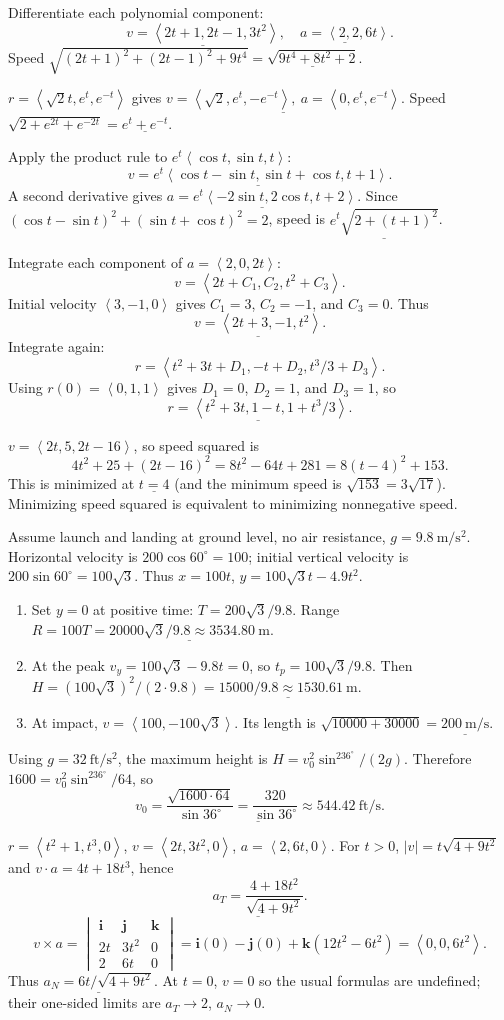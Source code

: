 \documentclass[10pt]{article}
\newcommand{\ex}[1]{\par\addvspace{6pt}\noindent\llap{\makebox[.62in][r]{\large\bfseries #1.\hspace{.12in}}}\ignorespaces}
\newcommand{\ans}[1]{\underline{#1}}
\newcommand{\vv}[1]{\left\langle #1\right\rangle}
\newcommand{\ii}{\mathbf i}\newcommand{\jj}{\mathbf j}\newcommand{\kk}{\mathbf k}
\newcommand{\cp}[6]{\begin{vmatrix}\ii&\jj&\kk\\#1&#2&#3\\#4&#5&#6\end{vmatrix}}
\begin{document}
\ex{9}
Differentiate each polynomial component:
\[\ans{v=\vv{2t+1,2t-1,3t^2}},\quad\ans{a=\vv{2,2,6t}}.\]
Speed $\sqrt{(2t+1)^2+(2t-1)^2+9t^4}=\ans{\sqrt{9t^4+8t^2+2}}$.
\ex{11}
$r=\vv{\sqrt2t,e^t,e^{-t}}$ gives $\ans{v=\vv{\sqrt2,e^t,-e^{-t}},\ a=\vv{0,e^t,e^{-t}}}$. Speed $\sqrt{2+e^{2t}+e^{-2t}}=\ans{e^t+e^{-t}}$.
\ex{13}
Apply the product rule to $e^t\vv{\cos t,\sin t,t}$:
\[\ans{v=e^t\vv{\cos t-\sin t,\sin t+\cos t,t+1}}.\]
A second derivative gives $\ans{a=e^t\vv{-2\sin t,2\cos t,t+2}}$. Since $(\cos t-\sin t)^2+(\sin t+\cos t)^2=2$, speed is $\ans{e^t\sqrt{2+(t+1)^2}}$.
\ex{15}
Integrate each component of $a=\vv{2,0,2t}$:
\[v=\vv{2t+C_1,C_2,t^2+C_3}.\]
Initial velocity $\vv{3,-1,0}$ gives $C_1=3$, $C_2=-1$, and $C_3=0$. Thus
\[\ans{v=\vv{2t+3,-1,t^2}}.\]
Integrate again:
\[r=\vv{t^2+3t+D_1,-t+D_2,t^3/3+D_3}.\]
Using $r(0)=\vv{0,1,1}$ gives $D_1=0$, $D_2=1$, and $D_3=1$, so
\[\ans{r=\vv{t^2+3t,1-t,1+t^3/3}}.\]
\ex{19}
$v=\vv{2t,5,2t-16}$, so speed squared is
\[4t^2+25+(2t-16)^2=8t^2-64t+281=8(t-4)^2+153.\]
This is minimized at $\ans{t=4}$ (and the minimum speed is $\sqrt{153}=3\sqrt{17}$). Minimizing speed squared is equivalent to minimizing nonnegative speed.
\ex{23}
Assume launch and landing at ground level, no air resistance, $g=9.8\ \mathrm{m/s^2}$. Horizontal velocity is $200\cos60^\circ=100$; initial vertical velocity is $200\sin60^\circ=100\sqrt3$. Thus $x=100t$, $y=100\sqrt3t-4.9t^2$.
\begin{enumerate}[label=(\alph*)]
\item Set $y=0$ at positive time: $T=200\sqrt3/9.8$. Range $R=100T=\ans{20000\sqrt3/9.8\approx3534.80\ \mathrm m}$.
\item At the peak $v_y=100\sqrt3-9.8t=0$, so $t_p=100\sqrt3/9.8$. Then $H=(100\sqrt3)^2/(2\cdot9.8)=\ans{15000/9.8\approx1530.61\ \mathrm m}$.
\item At impact, $v=\vv{100,-100\sqrt3}$. Its length is $\sqrt{10000+30000}=\ans{200\ \mathrm{m/s}}$.
\end{enumerate}
\ex{27}
Using $g=32\ \mathrm{ft/s^2}$, the maximum height is $H=v_0^2\sin^236^\circ/(2g)$. Therefore $1600=v_0^2\sin^236^\circ/64$, so
\[\ans{v_0=\frac{\sqrt{1600\cdot64}}{\sin36^\circ}=\frac{320}{\sin36^\circ}\approx544.42\ \mathrm{ft/s}}.\]
\ex{37}
$r=\vv{t^2+1,t^3,0}$, $v=\vv{2t,3t^2,0}$, $a=\vv{2,6t,0}$. For $t>0$, $|v|=t\sqrt{4+9t^2}$ and $v\cdot a=4t+18t^3$, hence
\[\ans{a_T=\frac{4+18t^2}{\sqrt{4+9t^2}}}.\]
\[v\times a=\cp{2t}{3t^2}{0}{2}{6t}{0}=\ii(0)-\jj(0)+\kk(12t^2-6t^2)=\vv{0,0,6t^2}.\]
Thus $\ans{a_N=6t/\sqrt{4+9t^2}}$. At $t=0$, $v=0$ so the usual formulas are undefined; their one-sided limits are $a_T\to2$, $a_N\to0$.
\end{document}
